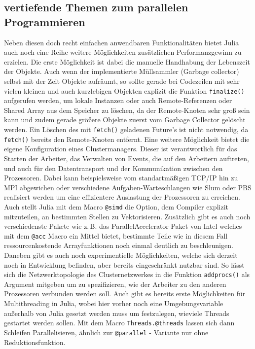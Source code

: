 \documentclass[proseminar,german,utf8]{zihpub}
\newcommand{\zB}[0]{{z.\,B. }}
\begin{document}
\subsection{vertiefende Themen zum parallelen Programmieren}

Neben diesen doch recht einfachen anwendbaren Funktionalitäten bietet Julia auch noch eine Reihe weitere Möglichkeiten zusätzlichen Performanzgewinn zu erzielen. Die erste Möglichkeit ist dabei die manuelle Handhabung der Lebenszeit der Objekte. Auch wenn der implementierte Müllsammler (Garbage collector) selbst mit der Zeit Objekte aufräumt, so sollte gerade bei Codezeilen mit sehr vielen kleinen und auch kurzlebigen Objekten explizit die Funktion \verb|finalize()| aufgerufen werden, um lokale Instanzen oder auch Remote-Referenzen oder Shared Array aus dem Speicher zu löschen, da der Remote-Knoten sehr groß sein kann und zudem gerade größere Objekte zuerst vom Garbage Collector gelöscht werden. Ein Löschen des mit \verb|fetch()| geladenen Future's ist nicht notwendig, da \verb|fetch()| bereits den Remote-Knoten entfernt. Eine weitere Möglichkeit bietet die eigene Konfiguration eines Clustermanagers. Dieser ist verantwortlich für das Starten der Arbeiter, das Verwalten von Events, die auf den Arbeitern auftreten, und auch für den Datentransport und der Kommunikation zwischen den Prozessoren. Dabei kann beispielsweise vom standartmäßigen TCP/IP hin zu MPI abgewichen oder verschiedene Aufgaben-Warteschlangen wie Slum oder PBS realisiert werden um eine effizientere Auslastung der Prozessoren zu erreichen. Auch stellt Julia mit dem Macro \verb|@simd| die Option, dem Compiler explizit mitzuteilen, an bestimmten Stellen zu Vektorisieren. Zusätzlich gibt es auch noch verschiedenste Pakete wie \zB das ParallelAccelerator-Paket von Intel welches mit dem \verb|@acc| Macro ein Mittel bietet, bestimmte Teile wie in diesem Fall ressourcenkostende Arrayfunktionen noch einmal deutlich zu beschleunigen. Daneben gibt es auch noch experimentielle Möglichkeiten, welche sich derzeit noch in Entwicklung befinden, aber bereits eingeschränkt nutzbar sind. So lässt sich die Netzwerktopologie des Clusternetzwerkes in die Funktion \verb|addprocs()| als Argument mitgeben um zu spezifizieren, wie der Arbeiter zu den anderen Prozessoren verbunden werden soll. Auch gibt es bereits erste Möglichkeiten für Multithreading in Julia, wobei hier vorher noch eine Umgebungsvariable außerhalb von Julia gesetzt werden muss um festzulegen, wieviele Threads gestartet werden sollen. Mit dem Macro \verb|Threads.@threads| lassen sich dann Schleifen Parallelisieren, ähnlich zur \verb|@parallel| - Variante nur ohne Reduktionsfunktion.
\end{document}
